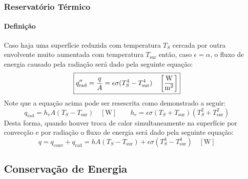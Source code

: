 \documentclass{article}
\begin{document}
        \subsubsection{Reservatório Térmico}
            \paragraph{Definição}Caso haja uma superfície reduzida com temperatura $T_{S}$ cercada por outra envolvente muito aumentada com temperatura $T_{\text{sur}}$ então, caso $\epsilon = \alpha$, o fluxo de energia causado pela radiação será dado pela seguinte equação:
                \begin{equation}
                    \boxed{
                        q_{\text{rad}}'' = \frac{q}{A} = \epsilon\sigma(T_{S}^{4} - T_{\text{sur}}^{4}) 
                        \quad 
                        \left[\frac{\text{W}}{\text{m\textsuperscript{2}}}\right]
                    }
                \end{equation}
            Note que a equação acima pode ser resescrita como demonstrado a seguir:
                \begin{equation}
                    \boxed{
                        q_{\text{rad}} = h_{r} A (T_{S} - T_{\text{sur}}) 
                        \quad 
                        [\text{W}]
                    }
                    \qquad
                    \boxed{
                        h_{r} = \epsilon \sigma (T_{S} + T_{\text{sur}})(T_{S}^{2} + T_{\text{sur}}^{2})
                    }
                \end{equation}
            Desta forma, quando houver troca de calor simultaneamente na superfície por convecção e por radiação o fluxo de energia será dado pela seguinte equação:
                \begin{equation}
                    \boxed{
                        q = q_{\text{conv}} + q_{\text{rad}} = 
                        h A (T_{S} - T_{\text{sur}}) + \epsilon\sigma(T_{S}^{4} - T_{\text{sur}}^{4}) 
                        \quad 
                        [\text{W}]
                    }
                \end{equation}

        \subsection{Conservação de Energia}
\end{document}
